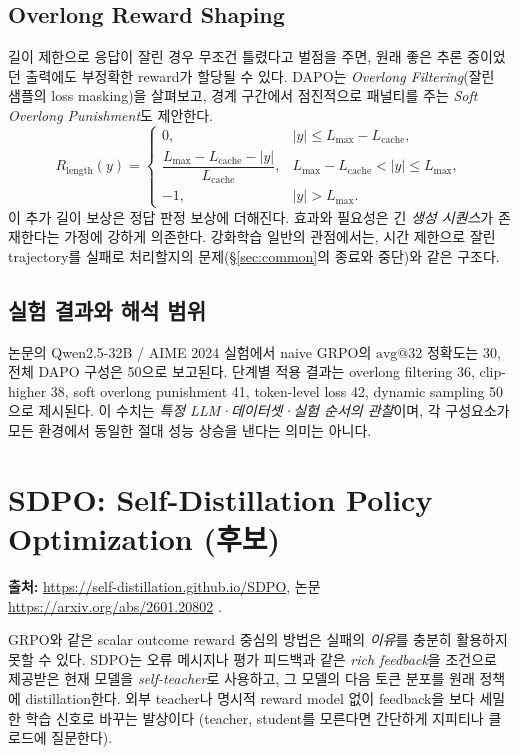 \documentclass[11pt,a4paper]{article}
\begin{document}
\subsection{Overlong Reward Shaping}
길이 제한으로 응답이 잘린 경우 무조건 틀렸다고 벌점을 주면, 원래 좋은 추론 중이었던 출력에도 부정확한 reward가 할당될 수 있다. DAPO는 \emph{Overlong Filtering}(잘린 샘플의 loss masking)을 살펴보고, 경계 구간에서 점진적으로 패널티를 주는 \emph{Soft Overlong Punishment}도 제안한다.
\begin{equation}
 R_{\mathrm{length}}(y)=
 \begin{cases}
 0,&|y|\le L_{\max}-L_{\mathrm{cache}},\\
 \dfrac{L_{\max}-L_{\mathrm{cache}}-|y|}{L_{\mathrm{cache}}},& L_{\max}-L_{\mathrm{cache}}<|y|\le L_{\max},\\
 -1,&|y|>L_{\max}.
 \end{cases}
\end{equation}
이 추가 길이 보상은 정답 판정 보상에 더해진다. 효과와 필요성은 긴 \emph{생성 시퀀스}가 존재한다는 가정에 강하게 의존한다. 강화학습 일반의 관점에서는, 시간 제한으로 잘린 trajectory를 실패로 처리할지의 문제(\S\ref{sec:common}의 종료와 중단)와 같은 구조다.

\subsection{실험 결과와 해석 범위}
논문의 Qwen2.5-32B / AIME 2024 실험에서 naive GRPO의 \(\mathrm{avg@32}\) 정확도는 30, 전체 DAPO 구성은 50으로 보고된다. 단계별 적용 결과는 overlong filtering 36, clip-higher 38, soft overlong punishment 41, token-level loss 42, dynamic sampling 50으로 제시된다. 이 수치는 \emph{특정 LLM·데이터셋·실험 순서의 관찰}이며, 각 구성요소가 모든 환경에서 동일한 절대 성능 상승을 낸다는 의미는 아니다.

\section{SDPO: Self-Distillation Policy Optimization (후보)}\label{sec:sdpo}
\noindent\textbf{출처:} \url{https://self-distillation.github.io/SDPO}, 논문 \url{https://arxiv.org/abs/2601.20802} \cite{sdpo}.

GRPO와 같은 scalar outcome reward 중심의 방법은 실패의 \emph{이유}를 충분히 활용하지 못할 수 있다. SDPO는 오류 메시지나 평가 피드백과 같은 \emph{rich feedback}을 조건으로 제공받은 현재 모델을 \emph{self-teacher}로 사용하고, 그 모델의 다음 토큰 분포를 원래 정책에 distillation한다. 외부 teacher나 명시적 reward model 없이 feedback을 보다 세밀한 학습 신호로 바꾸는 발상이다 (teacher, student를 모른다면 간단하게 지피티나 클로드에 질문한다).
\end{document}
